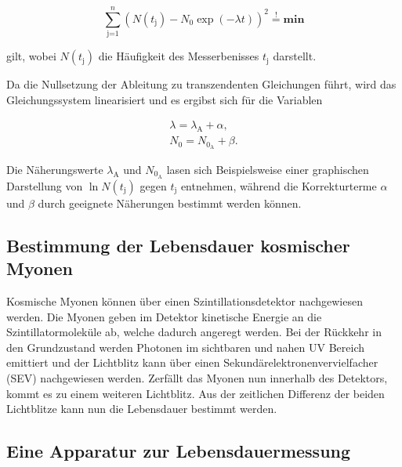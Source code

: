 \begin{equation}
	\sum_\text{j=1}^n \left(N(t_\text{j})-N_\text{0}\exp{(-\lambda t)}\right)^2 \stackrel{!}{=} \textbf{min}
\end{equation}

gilt, wobei $N(t_\text{j})$ die Häufigkeit des Messerbenisses $t_\text{j}$ darstellt.

Da die Nullsetzung der Ableitung zu transzendenten Gleichungen führt, wird das Gleichungssystem linearisiert und es ergibst sich für die Variablen

\begin{eqnarray}
	\lambda = \lambda_\text{A} + \alpha ,\\
	N_\text{0} = N_{\text{0}_\text{A}} + \beta.
\end{eqnarray}

Die Näherungswerte $\lambda_\text{A}$ und $N_{\text{0}_\text{A}}$ lasen sich Beispielsweise einer graphischen Darstellung von $\ln{N(t_\text{j})}$ gegen $t_\text{j}$ entnehmen, während die Korrekturterme $\alpha$ und $\beta$ durch geeignete Näherungen bestimmt werden können.
\FloatBarrier
\subsection{Bestimmung der Lebensdauer kosmischer Myonen} %
\label{sub:bestimmung_der_lebensdauer_kosmischer_myonen}

Kosmische Myonen können über einen Szintillationsdetektor nachgewiesen werden.
Die Myonen geben im Detektor kinetische Energie an die Szintillatormoleküle ab, welche dadurch angeregt werden.
Bei der Rückkehr in den Grundzustand werden Photonen im sichtbaren und nahen UV Bereich emittiert und der Lichtblitz kann über einen Sekundärelektronenvervielfacher (SEV) nachgewiesen werden.
Zerfällt das Myonen nun innerhalb des Detektors, kommt es zu einem weiteren Lichtblitz.
Aus der zeitlichen Differenz der beiden Lichtblitze kann nun die Lebensdauer bestimmt werden.
\FloatBarrier
\subsection{Eine Apparatur zur Lebensdauermessung} %
\label{sub:eine_apparatur_zur_lebensdauermessung}

